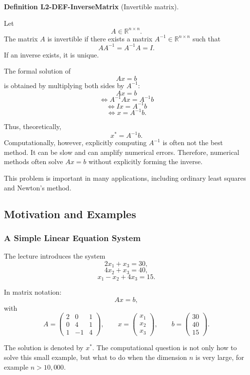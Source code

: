 \documentclass[10pt, letterpaper]{article}
\newcommand{\R}{\mathbb{R}}
\newcommand{\CustomHeading}[3]{%
  \par\medskip\noindent%
  \textbf{#1 #2} \textnormal{(#3)}.\enskip%
}
\newenvironment{DEF}[2]{\CustomHeading{Definition}{#1}{#2}}{}
\begin{document}
\begin{DEF}{L2-DEF-InverseMatrix}{Invertible matrix}
Let
\[
A\in\R^{n\times n}.
\]
The matrix \(A\) is invertible if there exists a matrix \(A^{-1}\in\R^{n\times n}\) such that
\[
AA^{-1}=A^{-1}A=I.
\]
If an inverse exists, it is unique.
\end{DEF}

The formal solution of
\[
Ax=b
\]
is obtained by multiplying both sides by \(A^{-1}\):
\[
Ax=b
\]
\[
\Longleftrightarrow
A^{-1}Ax=A^{-1}b
\]
\[
\Longleftrightarrow
Ix=A^{-1}b
\]
\[
\Longleftrightarrow
x=A^{-1}b.
\]

Thus, theoretically,
\[
x^\ast=A^{-1}b.
\]
Computationally, however, explicitly computing \(A^{-1}\) is often not the best method. It can be slow and can amplify numerical errors. Therefore, numerical methods often solve \(Ax=b\) without explicitly forming the inverse.

This problem is important in many applications, including ordinary least squares and Newton's method.

\subsection{Motivation and Examples}

\subsubsection{A Simple Linear Equation System}

The lecture introduces the system
\[
2x_1+x_3=30,
\]
\[
4x_2+x_3=40,
\]
\[
x_1-x_2+4x_3=15.
\]

In matrix notation:
\[
Ax=b,
\]
with
\[
A=
\begin{pmatrix}
2 & 0 & 1\\
0 & 4 & 1\\
1 & -1 & 4
\end{pmatrix},
\qquad
x=
\begin{pmatrix}
x_1\\
x_2\\
x_3
\end{pmatrix},
\qquad
b=
\begin{pmatrix}
30\\
40\\
15
\end{pmatrix}.
\]

The solution is denoted by \(x^\ast\). The computational question is not only how to solve this small example, but what to do when the dimension \(n\) is very large, for example \(n>10{,}000\).
\end{document}

